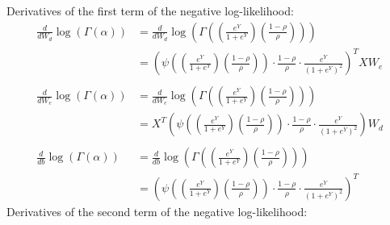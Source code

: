 \documentclass[12pt,a4paper]{article}
\begin{document}
Derivatives of the first term of the negative log-likelihood:
\begin{align*}
\frac{d}{d W_{d}} \log(\Gamma(\alpha)) &= \frac{d}{d W_{d}} \log\left(\Gamma\left(\left(\frac{e^{Y}}{1+e^{Y}}\right)\left(\frac{1-\rho}{\rho}\right)\right)\right)\\
	&= \left(\psi\left(\left(\frac{e^{Y}}{1+e^{Y}}\right)\left(\frac{1-\rho}{\rho}\right) \right) \cdot \frac{1-\rho}{\rho} \cdot \frac{e^{Y}}{\left(1+e^{Y}\right)^2} \right)^T XW_e \\
	\ \\
\frac{d}{d W_{e}} \log(\Gamma(\alpha)) &= \frac{d}{d W_{e}} \log\left(\Gamma\left(\left(\frac{e^{Y}}{1+e^{Y}}\right)\left(\frac{1-\rho}{\rho}\right)\right)\right)\\ 
	&= X^T \left(\psi\left(\left(\frac{e^{Y}}{1+e^{Y}}\right)\left(\frac{1-\rho}{\rho}\right) \right) \cdot \frac{1-\rho}{\rho} \cdot \frac{e^{Y}}{\left(1+e^{Y}\right)^2} \right) W_d \\
	\ \\
\frac{d}{d b} \log(\Gamma(\alpha)) &= \frac{d}{d b} \log\left(\Gamma\left(\left(\frac{e^{Y}}{1+e^{Y}}\right)\left(\frac{1-\rho}{\rho}\right)\right)\right)\\
	&= \left(\psi\left(\left(\frac{e^{Y}}{1+e^{Y}}\right)\left(\frac{1-\rho}{\rho}\right) \right) \cdot \frac{1-\rho}{\rho} \cdot \frac{e^{Y}}{\left(1+e^{Y}\right)^2} \right)^T
\end{align*}
Derivatives of the second term of the negative log-likelihood:
\end{document}
